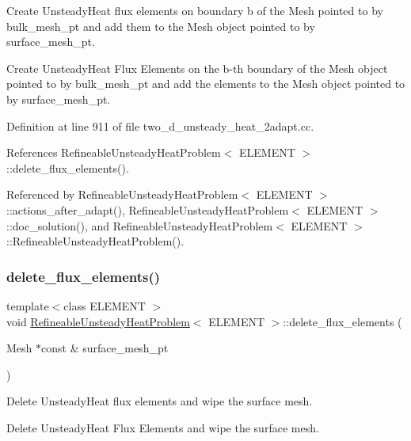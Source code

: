 Create Unsteady\+Heat flux elements on boundary b of the Mesh pointed to by bulk\+\_\+mesh\+\_\+pt and add them to the Mesh object pointed to by surface\+\_\+mesh\+\_\+pt. 

Create Unsteady\+Heat Flux Elements on the b-\/th boundary of the Mesh object pointed to by bulk\+\_\+mesh\+\_\+pt and add the elements to the Mesh object pointed to by surface\+\_\+mesh\+\_\+pt. 

Definition at line 911 of file two\+\_\+d\+\_\+unsteady\+\_\+heat\+\_\+2adapt.\+cc.



References Refineable\+Unsteady\+Heat\+Problem$<$ E\+L\+E\+M\+E\+N\+T $>$\+::delete\+\_\+flux\+\_\+elements().



Referenced by Refineable\+Unsteady\+Heat\+Problem$<$ E\+L\+E\+M\+E\+N\+T $>$\+::actions\+\_\+after\+\_\+adapt(), Refineable\+Unsteady\+Heat\+Problem$<$ E\+L\+E\+M\+E\+N\+T $>$\+::doc\+\_\+solution(), and Refineable\+Unsteady\+Heat\+Problem$<$ E\+L\+E\+M\+E\+N\+T $>$\+::\+Refineable\+Unsteady\+Heat\+Problem().

\mbox{\label{classRefineableUnsteadyHeatProblem_ad2e53af5c385e44e33e400b430b610e8}} 
\subsubsection{\texorpdfstring{delete\+\_\+flux\+\_\+elements()}{delete\_flux\_elements()}}
{\footnotesize\ttfamily template$<$class E\+L\+E\+M\+E\+NT $>$ \\
void \hyperlink{classRefineableUnsteadyHeatProblem}{Refineable\+Unsteady\+Heat\+Problem}$<$ E\+L\+E\+M\+E\+NT $>$\+::delete\+\_\+flux\+\_\+elements (\begin{DoxyParamCaption}\item[{Mesh $\ast$const \&}]{surface\+\_\+mesh\+\_\+pt }\end{DoxyParamCaption})}



Delete Unsteady\+Heat flux elements and wipe the surface mesh. 

Delete Unsteady\+Heat Flux Elements and wipe the surface mesh. 

